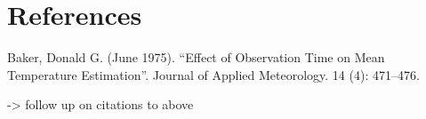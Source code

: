 \documentclass[letter]{article}
\begin{document}
    	\section{References}\label{references}

Baker, Donald G. (June 1975). ``Effect of Observation Time on Mean
Temperature Estimation''. Journal of Applied Meteorology. 14 (4):
471--476.

-\textgreater{} follow up on citations to above
    



    
    
    
    
\end{document}
